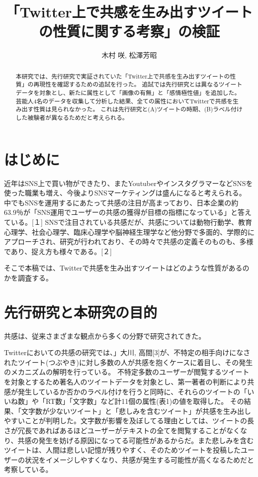 \documentclass[dvipdfmx]{issj}
\title{「Twitter上で共感を生み出すツイートの性質に関する考察」の検証}
\author{木村 咲\uddag, 松澤芳昭\uddag}
\affiliation{\dag 青山学院大学　社会情報情報学部\ddag }
\begin{document}
\maketitle
\begin{abstract}
本研究では、先行研究で実証されていた「Twitter上で共感を生み出すツイートの性質」の再現性を確認するための追試を行った。 追試では先行研究とは異なるツイートデータを対象とし、新たに属性として「画像の有無」と「感情極性値」を追加した。 芸能人4名のデータを収集して分析した結果、全ての属性においてTwitterで共感を生み出す性質は見られなかった。 これは先行研究と(A)ツイートの時期、(B)ラベル付けした被験者が異なるためだと考えられる。
\end{abstract}
\section{はじめに} %

近年はSNS上で買い物ができたり、またYoutuberやインスタグラマーなどSNSを使った職業も増え、今後よりSNSマーケティングは盛んになると考えられる。
中でもSNSを運用するにあたって共感の注目が高まっており、日本企業の約63.9％が「SNS運用でユーザーの共感の獲得が目標の指標になっている」と答えている。[１] 
SNSで注目されている共感だが、共感については動物行動学、教育心理学、社会心理学、臨床心理学や脳神経生理学など他分野で多面的、学際的にアプローチされ、研究が行われており、その時々で共感の定義そのものも、多様であり、捉え方も様々である。[２]

そこで本稿では、Twitterで共感を生み出すツイートはどのような性質があるのかを調査する。





\section{先行研究と本研究の目的}  %

共感は、従来さまざまな観点から多くの分野で研究されてきた。

Twitterにおいての共感の研究では、」大川, 高間[3]が、不特定の相手向けになされたツイート(つぶやき)に対し多数の人が共感を抱くケースに着目し、その発生のメカニズムの解明を行っている。
不特定多数のユーザーが閲覧するツイートを対象とするため著名人のツイートデータを対象とし、第一著者の判断により共感が発生しているか否かのラベル付けを行うと同時に、それらのツイートの「いいね数」や「RT数」「文字数」など計11個の属性(表1)の値を取得した。
その結果、「文字数が少ないツイート」と「悲しみを含むツイート」が共感を生み出しやすいことが判明した。文字数が影響を及ぼしてる理由としては、ツイートの長さが冗長であればあるほどユーザーがテキストの全てを閲覧することがなくなり、共感の発生を妨げる原因になってる可能性があるからだ。また悲しみを含むツイートは、人間は悲しい記憶が残りやすく、そのためツイートを投稿したユーザーの状況をイメージしやすくなり、共感が発生する可能性が高くなるためだと考察している。
\end{document}
